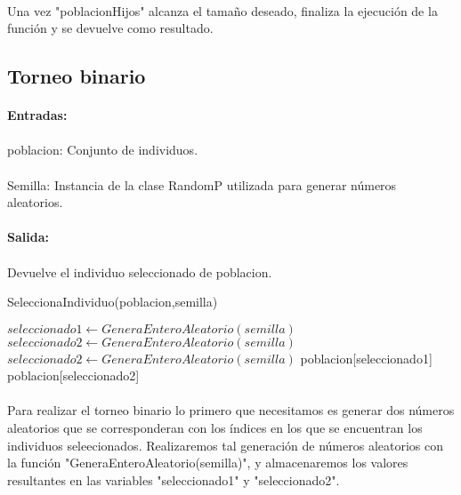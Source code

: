 	\paragraph{}Una vez "poblacionHijos" alcanza el tamaño deseado, finaliza la ejecución de la función y se devuelve como resultado.
	
	\subsection{Torneo binario}
	
	\paragraph{Entradas:}
	
	\paragraph{}poblacion: Conjunto de individuos.
	
	\paragraph{}Semilla: Instancia de la clase RandomP utilizada para generar números aleatorios.
	
	\paragraph{Salida:}

	\paragraph{}Devuelve el individuo seleccionado de poblacion.
	
	\begin{algorithm}[H]
		\caption{SeleccionaIndividuo(poblacion,semilla)}
		\begin{algorithmic}
			\STATE $seleccionado1 \leftarrow GeneraEnteroAleatorio(semilla)$
			\STATE $seleccionado2 \leftarrow GeneraEnteroAleatorio(semilla)$
			\STATE $seleccionado2 \leftarrow GeneraEnteroAleatorio(semilla)$
			\ENDWHILE
			\RETURN poblacion[seleccionado1]
			\ELSE
			\RETURN poblacion[seleccionado2]
			\ENDIF
		\end{algorithmic}
	\end{algorithm}

	\paragraph{}Para realizar el torneo binario lo primero que necesitamos es generar dos números aleatorios que se corresponderan con los índices en los que se encuentran los individuos seleecionados. Realizaremos tal generación de números aleatorios con la función "GeneraEnteroAleatorio(semilla)", y almacenaremos los valores resultantes en las variables "seleccionado1" y "seleccionado2".
	
